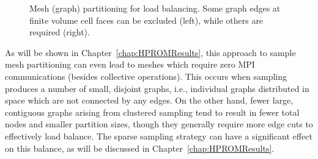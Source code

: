 \begin{figure}
\begin{minipage}{0.45\linewidth}
    \end{minipage}
    \caption{\label{fig:edgeCuts}Mesh (graph) partitioning for load balancing. Some graph edges at finite volume cell faces can be excluded (left), while others are required (right).}
\end{figure}

As will be shown in Chapter~\ref{chap:HPROMResults}, this approach to sample mesh partitioning can even lead to meshes which require zero MPI communications (besides collective operations). This occurs when sampling produces a number of small, disjoint graphs, i.e., individual graphs distributed in space which are not connected by any edges. On the other hand, fewer large, contiguous graphs arising from clustered sampling tend to result in fewer total nodes and smaller partition sizes, though they generally require more edge cuts to effectively load balance. The sparse sampling strategy can have a significant effect on this balance, as will be discussed in Chapter~\ref{chap:HPROMResults}.

